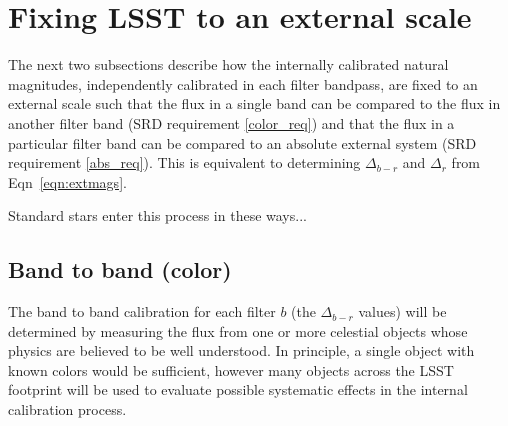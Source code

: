 \documentclass[12pt,preprint]{aastex}
\begin{document}
\section{Fixing LSST to an external scale}
\label{sec:calib_external}

The next two subsections describe how the internally calibrated
natural magnitudes, independently calibrated in each filter bandpass, are fixed
to an external scale such that the flux in a single band can be compared to the
flux in another filter band (SRD requirement \ref{color_req}) and that
the flux in a particular filter band can be compared to an absolute
external system (SRD requirement \ref{abs_req}). This is equivalent to
determining $\Delta_{b-r}$ and $\Delta_r$ from Eqn~\ref{eqn:extmags}. 

Standard stars enter this process in these ways...

\subsection{Band to band (color)}

The band to band calibration for each filter $b$ (the $\Delta_{b-r}$
values) will be determined by measuring the flux from one or more
celestial objects whose physics are believed to be well
understood. In principle, a single object with known colors would be
sufficient, however many objects across the LSST footprint
will be used to evaluate possible systematic effects in the internal
calibration process. 
\end{document}
